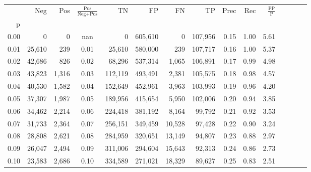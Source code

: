 \begin{tabular}{rrrcrrrrrrrrrrr}
\toprule
{} &     Neg &    Pos & $\frac{\text{Pos}}{\text{Neg}+\text{Pos}}$ &       TN &       FP &       FN &       TP &  Prec &   Rec & $\frac{\text{FP}}{\text{P}}$ \\
p    &         &        &                                            &          &          &          &          &       &       &                              \\
\midrule
0.00 &       0 &      0 &                                        nan &        0 &  605,610 &        0 &  107,956 &  0.15 &  1.00 &                         5.61 \\
0.01 &  25,610 &    239 &                                       0.01 &   25,610 &  580,000 &      239 &  107,717 &  0.16 &  1.00 &                         5.37 \\
0.02 &  42,686 &    826 &                                       0.02 &   68,296 &  537,314 &    1,065 &  106,891 &  0.17 &  0.99 &                         4.98 \\
0.03 &  43,823 &  1,316 &                                       0.03 &  112,119 &  493,491 &    2,381 &  105,575 &  0.18 &  0.98 &                         4.57 \\
0.04 &  40,530 &  1,582 &                                       0.04 &  152,649 &  452,961 &    3,963 &  103,993 &  0.19 &  0.96 &                         4.20 \\
0.05 &  37,307 &  1,987 &                                       0.05 &  189,956 &  415,654 &    5,950 &  102,006 &  0.20 &  0.94 &                         3.85 \\
0.06 &  34,462 &  2,214 &                                       0.06 &  224,418 &  381,192 &    8,164 &   99,792 &  0.21 &  0.92 &                         3.53 \\
0.07 &  31,733 &  2,364 &                                       0.07 &  256,151 &  349,459 &   10,528 &   97,428 &  0.22 &  0.90 &                         3.24 \\
0.08 &  28,808 &  2,621 &                                       0.08 &  284,959 &  320,651 &   13,149 &   94,807 &  0.23 &  0.88 &                         2.97 \\
0.09 &  26,047 &  2,494 &                                       0.09 &  311,006 &  294,604 &   15,643 &   92,313 &  0.24 &  0.86 &                         2.73 \\
0.10 &  23,583 &  2,686 &                                       0.10 &  334,589 &  271,021 &   18,329 &   89,627 &  0.25 &  0.83 &                         2.51 \\

\end{tabular}
